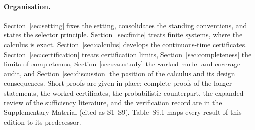 \paragraph{Organisation.} Section~\ref{sec:setting} fixes the setting, consolidates the standing conventions, and states the selector principle. Section~\ref{sec:finite} treats finite systems, where the calculus is exact. Section~\ref{sec:calculus} develops the continuous-time certificates. Section~\ref{sec:certification} treats certification limits, Section~\ref{sec:completeness} the limits of completeness, Section~\ref{sec:casestudy} the worked model and coverage audit, and Section~\ref{sec:discussion} the position of the calculus and its design consequences. Short proofs are given in place; complete proofs of the longer statements, the worked certificates, the probabilistic counterpart, the expanded review of the sufficiency literature, and the verification record are in the Supplementary Material (cited as S1--S9). Table~S9.1 maps every result of this edition to its predecessor.
